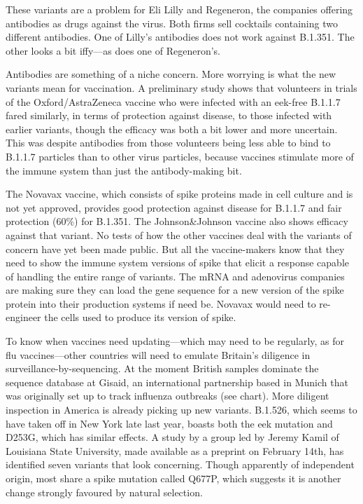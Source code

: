 \documentclass{article}
\begin{document}
These variants are a problem for Eli Lilly and Regeneron, the companies offering antibodies as drugs against the virus. Both firms sell cocktails containing two different antibodies. One of Lilly's antibodies does not work against B.1.351. The other looks a bit iffy---as does one of Regeneron's. 

Antibodies are something of a niche concern. More worrying is what the new variants mean for vaccination. A preliminary study shows that volunteers in trials of the Oxford/AstraZeneca vaccine who were infected with an eek-free B.1.1.7 fared similarly, in terms of protection against disease, to those infected with earlier variants, though the efficacy was both a bit lower and more uncertain. This was despite antibodies from those volunteers being less able to bind to B.1.1.7 particles than to other virus particles, because vaccines stimulate more of the immune system than just the antibody-making bit. 

The Novavax vaccine, which consists of spike proteins made in cell culture and is not yet approved, provides good protection against disease for B.1.1.7 and fair protection (60\%) for B.1.351. The Johnson\&Johnson vaccine also shows efficacy against that variant. No tests of how the other vaccines deal with the variants of concern have yet been made public. But all the vaccine-makers know that they need to show the immune system versions of spike that elicit a response capable of handling the entire range of variants. The mRNA and adenovirus companies are making sure they can load the gene sequence for a new version of the spike protein into their production systems if need be. Novavax would need to re-engineer the cells used to produce its version of spike. 

To know when vaccines need updating---which may need to be regularly, as for flu vaccines---other countries will need to emulate Britain's diligence in surveillance-by-sequencing. At the moment British samples dominate the sequence database at Gisaid, an international partnership based in Munich that was originally set up to track influenza outbreaks (see chart). More diligent inspection in America is already picking up new variants. B.1.526, which seems to have taken off in New York late last year, boasts both the eek mutation and D253G, which has similar effects. A study by a group led by Jeremy Kamil of Louisiana State University, made available as a preprint on February 14th, has identified seven variants that look concerning. Though apparently of independent origin, most share a spike mutation called Q677P, which suggests it is another change strongly favoured by natural selection. 
\end{document}

